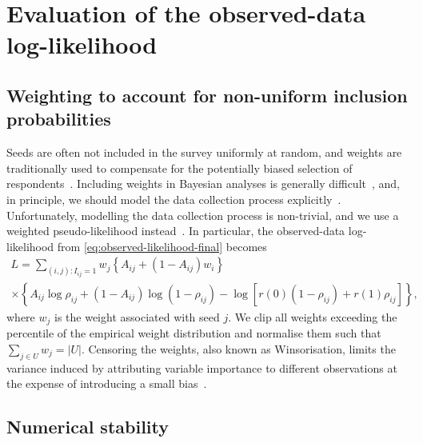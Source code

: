 \documentclass{scrartcl}
\newcommand{\card}[1]{\left|#1\right|}
\newcommand{\seeds}{U}
\begin{document}
\printbibliography

\appendix
{}

\section{Evaluation of the observed-data log-likelihood}

\subsection{Weighting to account for non-uniform inclusion probabilities}

Seeds are often not included in the survey uniformly at random, and weights are traditionally used to compensate for the potentially biased selection of respondents~\cite{Kish1992}. Including weights in Bayesian analyses is generally difficult~\cite{Gelman2007}, and, in principle, we should model the data collection process explicitly~\cite[chapter~8]{Gelman2013}. Unfortunately, modelling the data collection process is non-trivial, and we use a weighted pseudo-likelihood instead~\cite{Pfeffermann1996}. In particular, the observed-data log-likelihood from \cref{eq:observed-likelihood-final} becomes
\begin{multline}
    L = \sum_{(i,j):I_{ij} = 1} w_j\left\{A_{ij} + (1 - A_{ij})w_i\right\}
    \\\times\left\{A_{ij}\log\rho_{ij} + (1-A_{ij})\log(1-\rho_{ij})-\log\left[r(0)(1 - \rho_{ij}) + r(1)\rho_{ij}\right]\right\},\label{eq:survey-weighted-log-likelihood}
\end{multline}
where $w_j$ is the weight associated with seed $j$. We clip all weights exceeding the  percentile of the empirical weight distribution and normalise them such that $\sum_{j\in\seeds}w_j=\card{\seeds}$. Censoring the weights, also known as Winsorisation, limits the variance induced by attributing variable importance to different observations at the expense of introducing a small bias~\cite{Kish1992}.

\subsection{Numerical stability\label{app:numeric-stability}}
\end{document}
